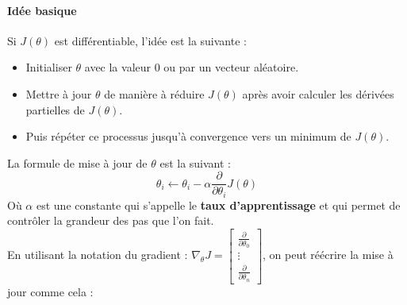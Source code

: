 


\paragraph{Idée basique}
Si $J(\theta)$ est différentiable, l'idée est la suivante :
\begin{itemize}
	\item Initialiser $\theta$ avec la valeur 0 ou par un vecteur aléatoire.
	\item Mettre à jour $\theta$ de manière à réduire $J(\theta)$ après avoir calculer les dérivées partielles de $J(\theta)$.
	\item Puis répéter ce processus jusqu'à convergence vers un minimum de $J(\theta)$.
\end{itemize}
La formule de mise à jour de $\theta$ est la suivant :
$$ \theta_i \gets \theta_i - \alpha \dfrac{\partial}{\partial \theta_i} J(\theta) $$
Où $\alpha$ est une constante qui s'appelle le \textbf{taux d'apprentissage} et qui permet de contrôler la grandeur des pas que l'on fait. \\
En utilisant la notation du gradient : $ \nabla_\theta J = \begin{bmatrix}
\frac{\partial}{\partial \theta_0} \\ \vdots \\ \frac{\partial}{\partial \theta_n}
\end{bmatrix} $, on peut réécrire la mise à jour comme cela :
\begin{center}
	\boldmath {}
\end{center}

